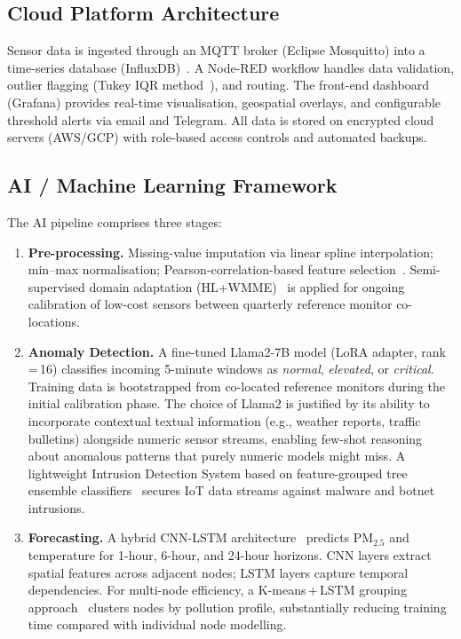 \subsection{Cloud Platform Architecture}
Sensor data is ingested through an MQTT broker (Eclipse Mosquitto) into a time-series database (InfluxDB)~\cite{yasin2022}. A Node-RED workflow handles data validation, outlier flagging (Tukey IQR method~\cite{garcia2022smart}), and routing. The front-end dashboard (Grafana) provides real-time visualisation, geospatial overlays, and configurable threshold alerts via email and Telegram. All data is stored on encrypted cloud servers (AWS/GCP) with role-based access controls and automated backups.

\subsection{AI / Machine Learning Framework}
\label{sec:ai_pipeline}
The AI pipeline comprises three stages:
\begin{enumerate}[leftmargin=*, label=\arabic*., itemsep=4pt]
  \item \textbf{Pre-processing.} Missing-value imputation via linear spline interpolation; min--max normalisation; Pearson-correlation-based feature selection~\cite{bekkar2021}. Semi-supervised domain adaptation (HL+WMME)~\cite{dey2022} is applied for ongoing calibration of low-cost sensors between quarterly reference monitor co-locations.
  \item \textbf{Anomaly Detection.} A fine-tuned Llama2-7B model (LoRA adapter, rank\,=\,16) classifies incoming 5-minute windows as \textit{normal}, \textit{elevated}, or \textit{critical}. Training data is bootstrapped from co-located reference monitors during the initial calibration phase. The choice of Llama2 is justified by its ability to incorporate contextual textual information (e.g., weather reports, traffic bulletins) alongside numeric sensor streams, enabling few-shot reasoning about anomalous patterns that purely numeric models might miss. A lightweight Intrusion Detection System based on feature-grouped tree ensemble classifiers~\cite{he2024} secures IoT data streams against malware and botnet intrusions.
  \item \textbf{Forecasting.} A hybrid CNN-LSTM architecture~\cite{bekkar2021} predicts PM$_{2.5}$ and temperature for 1-hour, 6-hour, and 24-hour horizons. CNN layers extract spatial features across adjacent nodes; LSTM layers capture temporal dependencies. For multi-node efficiency, a K-means\,+\,LSTM grouping approach~\cite{ariff2023} clusters nodes by pollution profile, substantially reducing training time compared with individual node modelling.
\end{enumerate}

